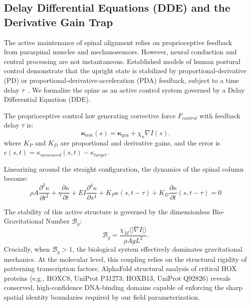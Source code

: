 \subsection{Delay Differential Equations (DDE) and the Derivative Gain Trap}

The active maintenance of spinal alignment relies on proprioceptive feedback from paraspinal muscles and mechanosensors. However, neural conduction and central processing are not instantaneous. Established models of human postural control demonstrate that the upright state is stabilized by proportional-derivative (PD) or proportional-derivative-acceleration (PDA) feedback, subject to a time delay $\tau$~\cite{milton2009time, insperger2013acceleration}. We formalize the spine as an active control system governed by a Delay Differential Equation (DDE).

The proprioceptive control law generating corrective force $F_{control}$ with feedback delay $\tau$ is:
\begin{equation}
\boldsymbol{\kappa}_{\mathrm{rest}}(s) = \boldsymbol{\kappa}_{\mathrm{gen}} + \chi_\kappa \nabla I(s).
\label{eq:kappa_rest_field}
\end{equation}
where $K_P$ and $K_D$ are proportional and derivative gains, and the error is $e(s,t) = \kappa_{measured}(s,t) - \kappa_{target}$.

Linearizing around the straight configuration, the dynamics of the spinal column become:
\begin{equation}
\rho A \frac{\partial^2 \kappa}{\partial t^2} + \eta \frac{\partial \kappa}{\partial t} + EI \frac{\partial^4 \kappa}{\partial s^4} + K_P \kappa(s, t-\tau) + K_D \frac{\partial \kappa}{\partial t}(s, t-\tau) = 0
\label{eq:dde_spine}
\end{equation}

The stability of this active structure is governed by the dimensionless Bio-Gravitational Number $\mathcal{B}_g$:
\begin{equation}
\mathcal{B}_g = \frac{\chi_M \langle |\nabla I| \rangle}{\rho A g L^2}.
\label{eq:bg_number_info}
\end{equation}
Crucially, when $\mathcal{B}_g > 1$, the biological system effectively dominates gravitational mechanics. At the molecular level, this coupling relies on the structural rigidity of patterning transcription factors; AlphaFold structural analysis of critical HOX proteins (e.g., HOXC8, UniProt P31273; HOXB13, UniProt Q92826) reveals conserved, high-confidence DNA-binding domains capable of enforcing the sharp spatial identity boundaries required by our field parameterization.

